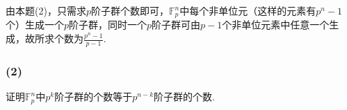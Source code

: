 \jie 由本题(2)，只需求$p$阶子群个数即可，$\mathbb{F}_p^n$中每个非单位元（这样的元素有$p^n-1$个）生成一个$p$阶子群，同时一个$p$阶子群可由$p-1$个非单位元素中任意一个生成，故所求个数为$\frac{p^n-1}{p-1}$.

\subsubsection{(2)}
证明$\mathbb{F}_p^n$中$p^k$阶子群的个数等于$p^{n-k}$阶子群的个数.

